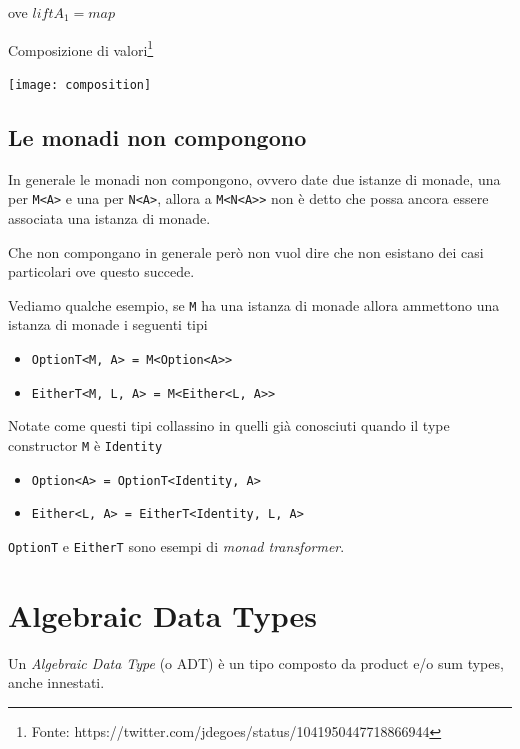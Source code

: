 \documentclass[12pt]{article}
\theoremstyle{definition}
\begin{document}
\begin{center}
ove $liftA_1 = map$
\end{center}

Composizione di valori\footnote{Fonte: https://twitter.com/jdegoes/status/1041950447718866944}

\begin{center}
\texttt{[image: composition]}
\end{center}

\newpage
\subsection{Le monadi non compongono}

In generale le monadi non compongono, ovvero date due istanze di monade, una per \texttt{M<A>} e una per \texttt{N<A>},
allora a \texttt{M<N<A>>} non è detto che possa ancora essere associata una istanza di monade.

Che non compongano in generale però non vuol dire che non esistano dei casi particolari ove questo succede.

Vediamo qualche esempio, se \texttt{M} ha una istanza di monade allora ammettono una istanza di monade i seguenti tipi

\begin{itemize}
  \item \texttt{OptionT<M, A> = M<Option<A>>}
  \item \texttt{EitherT<M, L, A> = M<Either<L, A>>}
\end{itemize}

Notate come questi tipi collassino in quelli già conosciuti quando il type constructor \texttt{M} è \texttt{Identity}

\begin{itemize}
  \item \texttt{Option<A> = OptionT<Identity, A>}
  \item \texttt{Either<L, A> = EitherT<Identity, L, A>}
\end{itemize}

\texttt{OptionT} e \texttt{EitherT} sono esempi di \emph{monad transformer}.

\newpage

\section{Algebraic Data Types}

Un \emph{Algebraic Data Type} (o ADT) è un tipo composto da product e/o sum types, anche innestati.
\end{document}
